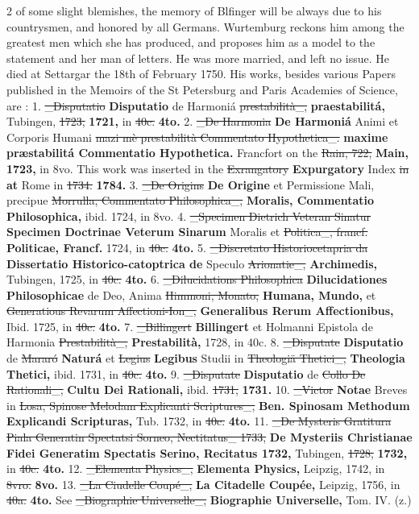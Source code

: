 \documentclass[10pt]{article}
\begin{document}
\begin{multicols}{2}
of some slight blemishes, the memory of Blfinger will be always due to his countrysmen, and honored by all Germans. Wurtemburg reckons him among the greatest men which she has produced, and proposes him as a model to the statement and her man of letters. He was more married, and left no issue. He died at Settargar the 18th of February 1750. His works, besides various Papers published in the Memoirs of the St Petersburg and Paris Academies of Science, are : 1. \sout{\_Disputatio} \textbf{Disputatio} de Harmoniá \sout{prestabilità\_,} \textbf{praestabilitá,} Tubingen, \sout{1723,} \textbf{1721,} in \sout{40c.} \textbf{4to.} 2. \sout{\_De Harmonia} \textbf{De Harmoniá} Animi et Corporis Humani \sout{mazi mè prestabilità Commentato Hypothetica\_.} \textbf{maxime præstabilitá Commentatio Hypothetica.} Francfort on the \sout{Rain, 722,} \textbf{Main, 1723,} in 8vo. This work was inserted in the \sout{Exrangatory} \textbf{Expurgatory} Index \sout{in} \textbf{at} Rome in \sout{1734.} \textbf{1784.} 3. \sout{\_De Origins} \textbf{De Origine} et Permissione Mali, precipue \sout{Morrulla, Commentato Philosophica\_,} \textbf{Moralis, Commentatio Philosophica,} ibid. 1724, in 8vo. 4. \sout{\_Specimen Dietrich Veteran Sinatur} \textbf{Specimen Doctrinae Veterum Sinarum} Moralis et \sout{Politica\_, francf.} \textbf{Politicae, Francf.} 1724, in \sout{40c.} \textbf{4to.} 5. \sout{\_Discretato Historiocetapria da} \textbf{Dissertatio Historico-catoptrica de} Speculo \sout{Arionatie\_,} \textbf{Archimedis,} Tubingen, 1725, in \sout{40c.} \textbf{4to.} 6. \sout{\_Dilucidations Philosophica} \textbf{Dilucidationes Philosophicae} de Deo, Anima \sout{Himmoni, Monato,} \textbf{Humana, Mundo,} et \sout{Generatious Revarum Affectioni-Ion\_,} \textbf{Generalibus Rerum Affectionibus,} Ibid. 1725, in \sout{40c.} \textbf{4to.} 7. \sout{\_Billingert} \textbf{Billingert} et Holmanni Epistola de Harmonia \sout{Prestabilità\_,} \textbf{Prestabilità,} 1728, in 40c. 8. \sout{\_Disputate} \textbf{Disputatio} de \sout{Mararó} \textbf{Naturá} et \sout{Legius} \textbf{Legibus} Studii in \sout{Theologiä Thetici\_,} \textbf{Theologia Thetici,} ibid. 1731, in \sout{40c.} \textbf{4to.} 9. \sout{\_Disputate} \textbf{Disputatio} de \sout{Collo De Rationali\_,} \textbf{Cultu Dei Rationali,} ibid. \sout{1731,} \textbf{1731.} 10. \sout{\_Victor} \textbf{Notae} Breves in \sout{Losa, Spinose Melodam Explicanti Scriptures\_,} \textbf{Ben. Spinosam Methodum Explicandi Scripturas,} Tub. 1732, in \sout{40c.} \textbf{4to.} 11. \sout{\_De Mysteris Gratitura Piala Generatin Spectatsi Sorneo, Nectitatus\_ 1733,} \textbf{De Mysteriis Christianae Fidei Generatim Spectatis Serino, Recitatus 1732,} Tubingen, \sout{1728,} \textbf{1732,} in \sout{40c.} \textbf{4to.} 12. \sout{\_Elementa Physics\_,} \textbf{Elementa Physics,} Leipzig, 1742, in \sout{8vro.} \textbf{8vo.} 13. \sout{\_La Ciudelle Coupé\_,} \textbf{La Citadelle Coupée,} Leipzig, 1756, in \sout{40a.} \textbf{4to.} See \sout{\_Biographie Universelle\_,} \textbf{Biographie Universelle,} Tom. IV. (z.)
\end{multicols}
\end{document}
